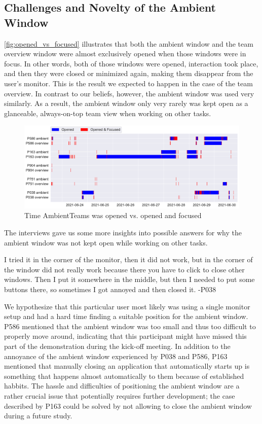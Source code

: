 \subsection{Challenges and Novelty of the Ambient Window}
\autoref{fig:opened_vs_focused} illustrates that both the ambient window and the team overview window were almost exclusively opened when those windows were in focus. In other words, both of those windows were opened, interaction took place, and then they were closed or minimized again, making them disappear from the user's monitor. This is the result we expected to happen in the case of the team overview. In contrast to our beliefs, however, the ambient window was used very similarly. As a result, the ambient window only very rarely was kept open as a glanceable, always-on-top team view when working on other tasks.

\begin{figure}[h]
    \centering
    \includegraphics[width=\linewidth]{plots/open_vs_focus.pdf}
    \caption{Time AmbientTeams was opened vs. opened and focused}
    \label{fig:opened_vs_focused}
\end{figure}

The interviews gave us some more insights into possible answers for why the ambient window was not kept open while working on other tasks.

\begin{displayquote}
    I tried it in the corner of the monitor, then it did not work, but in the corner of the window did not really work because there you have to click to close other windows. Then I put it somewhere in the middle, but then I needed to put some buttons there, so sometimes I got annoyed and then closed it. -P038
\end{displayquote}

We hypothesize that this particular user most likely was using a single monitor setup and had a hard time finding a suitable position for the ambient window. P586 mentioned that the ambient window was too small and thus too difficult to properly move around, indicating that this participant might have missed this part of the demonstration during the kick-off meeting. In addition to the annoyance of the ambient window experienced by P038 and P586, P163 mentioned that manually closing an application that automatically starts up is something that happens almost automatically to them because of established habbits. The hassle and difficulties of positioning the ambient window are a rather crucial issue that potentially requires further development; the case described by P163 could be solved by not allowing to close the ambient window during a future study.

